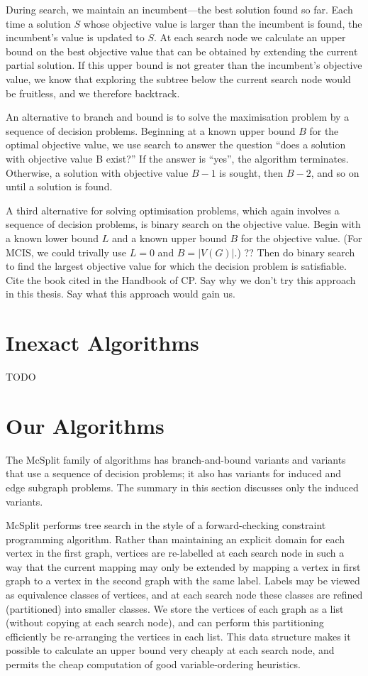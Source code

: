 During search, we maintain an incumbent---the best solution found so far. Each
time a solution $S$ whose objective value is larger than the incumbent is found,
the incumbent’s value is updated to $S$. At each search node we calculate an
upper bound on the best objective value that can be obtained by extending the
current partial solution. If this upper bound is not greater than the
incumbent’s objective value, we know that exploring the subtree below the
current search node would be fruitless, and we therefore backtrack.

An alternative to branch and bound is to solve the maximisation problem by a
sequence of decision problems. Beginning at a known upper bound $B$ for the
optimal objective value, we use search to answer the question “does a solution
with objective value B exist?” If the answer is “yes”, the algorithm
terminates. Otherwise, a solution with objective value $B-1$ is sought, then $B-2$,
and so on until a solution is found.

A third alternative for solving optimisation problems, which again involves a
sequence of decision problems, is binary search on the objective value. Begin
with a known lower bound $L$ and a known upper bound $B$ for the objective value.
(For MCIS, we could trivally use $L=0$ and $B=|V(G)|$.) ?? Then do binary search to
find the largest objective value for which the decision problem is satisfiable.
Cite the book cited in the Handbook of CP. Say why we don’t try this approach
in this thesis.  Say what this approach would gain us.

\section{Inexact Algorithms}

TODO

\section{Our Algorithms}

The McSplit family of algorithms has branch-and-bound variants and variants
that use a sequence of decision problems; it also has variants for induced and
edge subgraph problems. The summary in this section discusses only the induced
variants.

McSplit performs tree search in the style of a forward-checking constraint
programming algorithm. Rather than maintaining an explicit domain for each
vertex in the first graph, vertices are re-labelled at each search node in such
a way that the current mapping may only be extended by mapping a vertex in
first graph to a vertex in the second graph with the same label. Labels may be
viewed as equivalence classes of vertices, and at each search node these
classes are refined (partitioned) into smaller classes. We store the vertices
of each graph as a list (without copying at each search node), and can perform
this partitioning efficiently be re-arranging the vertices in each list. This
data structure makes it possible to calculate an upper bound very cheaply at
each search node, and permits the cheap computation of good variable-ordering
heuristics.

